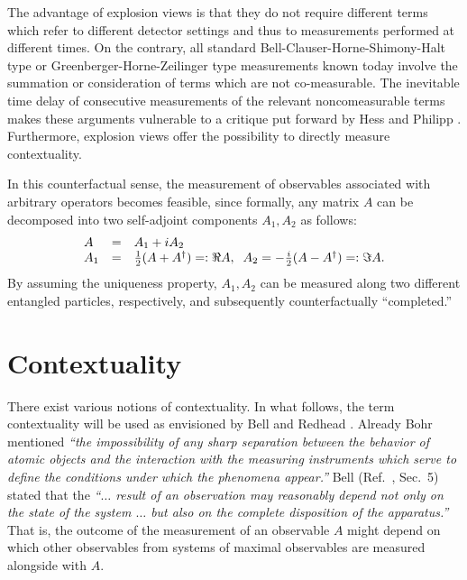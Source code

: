 \documentclass{aipproc}
\begin{document}
The advantage of explosion views
is that they do not require different terms which refer to different detector settings and thus to measurements
performed at different times.
On the contrary, all  standard Bell-Clauser-Horne-Shimony-Halt type
or Greenberger-Horne-Zeilinger type measurements \cite{panbdwz} known today
involve the summation or consideration of terms which are not co-measurable.
The inevitable time delay of consecutive measurements of the relevant noncomeasurable terms
makes these arguments vulnerable to a
critique put forward by Hess and Philipp \cite{Hess&Philipp2002}.
Furthermore, explosion views offer
the possibility to directly measure contextuality.

In this counterfactual sense, the measurement of observables associated with arbitrary operators
becomes feasible, since formally, any matrix $A$ can be decomposed into two
self-adjoint components
$A_1, A_2$ as follows:
\begin{equation}
\begin{array}{lllllll}
A&=&A_1+iA_2 \\
A_1&=&{1\over 2}(A+A^\dagger) =:\Re A,\;   \;
A_2=-{i\over 2}(A-A^\dagger)=:\Im A.
\end{array}  \label{e-decom1}
\end{equation}
By assuming the uniqueness property,  $A_1, A_2$ can be measured along two different entangled
particles, respectively, and subsequently counterfactually ``completed.''






\section{Contextuality}

There exist various notions of contextuality.
In what follows, the term contextuality will be used as envisioned by Bell and Redhead
\cite{bell-66,hey-red,redhead}.
Already
Bohr~\cite{bohr-1949} mentioned
{\em ``the impossibility of any sharp separation
between the behavior of atomic objects and the interaction with the measuring instruments which serve to define
the conditions under which the phenomena appear.''}
Bell (Ref.~\cite{bell-66}, Sec.~5) stated that the {\em ``$\ldots$
result of an observation may reasonably depend
not only on the state of the system  $\ldots$
but also on the complete disposition  of the apparatus.''}
That is, the outcome of the measurement of an observable  $A$
might depend on which other observables
from systems of maximal observables
are measured alongside with $A$.
\end{document}
